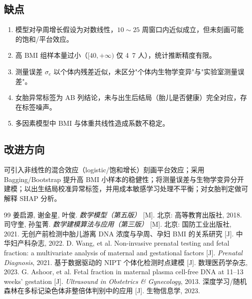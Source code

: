 \documentclass[12pt,a4paper]{article}
\begin{document}
\subsection{缺点}
\begin{enumerate}
\item 模型对孕周增长假设为对数线性，$10\sim25$ 周窗口内近似成立，但未刻画可能的饱和/平台效应。
\item 高 BMI 组样本量过小（$[40,+\infty)$ 仅 4~7 人），统计推断精度有限。
\item 测量误差 $\sigma_e$ 以个体内残差近似，未区分"个体内生物学变异"与"实验室测量误差"。
\item 女胎异常标签为 AB 列结论，未与出生后结局（胎儿是否健康）完全对应，存在标签噪声。
\item 多因素模型中 BMI 与体重共线性造成系数不稳定。
\end{enumerate}

\subsection{改进方向}
可引入非线性的混合效应（logistic/饱和增长）刻画平台效应；采用 Bagging/Bootstrap 提升高 BMI 小样本的稳健性；将测量误差与生物学变异分开建模；以出生结局校准异常标签，并用成本敏感学习处理不平衡；对女胎判定做可解释 SHAP 分析。

\begin{thebibliography}{99}
 姜启源, 谢金星, 叶俊. \textit{数学模型（第五版）} [M]. 北京: 高等教育出版社, 2018.
 司守奎, 孙玺菁. \textit{数学建模算法与应用（第三版）} [M]. 北京: 国防工业出版社, 2021.
 无创产前检测中胎儿游离 DNA 浓度与孕周、孕妇 BMI 的关系研究 [J]. 中华妇产科杂志, 2022.
 D. Wang, et al. Non-invasive prenatal testing and fetal fraction: a multivariate analysis of maternal and gestational factors [J]. \textit{Prenatal Diagnosis}, 2021.
 基于数据驱动的 NIPT 个体化检测时点建模 [J]. 数理医药学杂志, 2023.
 G. Ashoor, et al. Fetal fraction in maternal plasma cell-free DNA at 11–13 weeks' gestation [J]. \textit{Ultrasound in Obstetrics \& Gynecology}, 2013.
 深度学习/随机森林在多标记染色体非整倍体判别中的应用 [J]. 生物信息学, 2023.
\end{thebibliography}

\appendix
\end{document}
